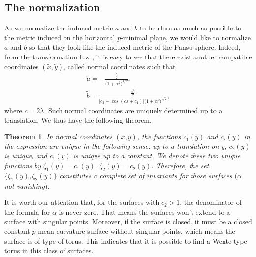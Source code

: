 \documentclass[10pt,a4paper]{amsart}
\numberwithin{equation}{section}
\newtheorem{Theorem}{Theorem}[section]
\begin{document}
\subsection{The normalization} As we normalize the induced metric $a$ and $b$ to be close as much as possible to the metric induced on the horizontal $p$-minimal plane, we would like to normalize $a$ and $b$ so that they look like the induced
metric of the Pansu sphere. Indeed, from the transformation law \cite[formula~(2.20)]{ChiuH/LiuH:2022}, it is easy to see that there exist
another compatible coordinates $(\tilde{x},\tilde{y})$, called
normal coordinates such that
\begin{gather}
\tilde{a}=-\frac{\frac{c}{2}}{\bigl(1+\alpha^{2}\bigr)^{1/2}}, \label{nora}
\\
\tilde{b}=\frac{\frac{c^2}{2}}{|c_{2}-\cos{(cx+c_{1})}|\bigl(1+\alpha^{2}\bigr)^{1/2}}, \label{norb}
\end{gather}
where $c=2\lambda$. Such normal coordinates are uniquely determined up to a translation. We thus have the following theorem.

\begin{Theorem}
\label{cominv} In normal coordinates $(x,y)$, the functions $c_{1}(y)$ and $
c_{2}(y)$ in the expression  are unique in the following sense: up to a
translation on $y$, $c_{2}(y)$ is unique, and $c_{1}(y)$ is unique up to a
constant. We denote these two unique functions by
$
\zeta_{1}(y)=c_{1}(y)$, $ \zeta_{2}(y)=c_{2}(y)$.
Therefore, the set $\{\zeta_{1}(y), \zeta_{2}(y)\}$ constitutes a \emph{complete} set of
invariants for those surfaces $(\alpha$ not vanishing$)$.
\end{Theorem}

It is worth our attention that, for the surfaces with $c_{2}>1$, the
denominator of the formula for $\alpha$ is never zero. That means the
surfaces won't extend to a surface with singular points. Moreover, if the
surface is closed, it must be a closed constant $p$-mean curvature
surface without singular points, which means the surface is of type of
torus. This indicates that it is possible to find a Wente-type torus in this
class of surfaces.
\end{document}
